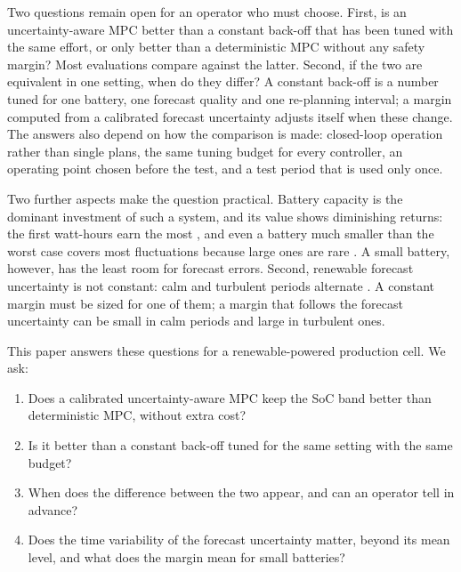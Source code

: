 \documentclass[a4paper,fleqn]{cas-dc}
\begin{document}
Two questions remain open for an operator who must choose. First, is an uncertainty-aware MPC better than a constant back-off that has been tuned with the same effort, or only better than a deterministic MPC without any safety margin? Most evaluations compare against the latter. Second, if the two are equivalent in one setting, when do they differ? A constant back-off is a number tuned for one battery, one forecast quality and one re-planning interval; a margin computed from a calibrated forecast uncertainty adjusts itself when these change. The answers also depend on how the comparison is made: closed-loop operation rather than single plans, the same tuning budget for every controller, an operating point chosen before the test, and a test period that is used only once.

Two further aspects make the question practical. Battery capacity is the dominant investment of such a system, and its value shows diminishing returns: the first watt-hours earn the most \cite{weniger2014sizing,quoilin2016quantifying,mulleriyawage2020optimally}, and even a battery much smaller than the worst case covers most fluctuations because large ones are rare \cite{makibar2017relation}. A small battery, however, has the least room for forecast errors. Second, renewable forecast uncertainty is not constant: calm and turbulent periods alternate \cite{widen2015variability,stein2012variability}. A constant margin must be sized for one of them; a margin that follows the forecast uncertainty can be small in calm periods and large in turbulent ones.

This paper answers these questions for a renewable-powered production cell. We ask:
\begin{enumerate}
\item[RQ1] Does a calibrated uncertainty-aware MPC keep the SoC band better than deterministic MPC, without extra cost?
\item[RQ2] Is it better than a constant back-off tuned for the same setting with the same budget?
\item[RQ3] When does the difference between the two appear, and can an operator tell in advance?
\item[RQ4] Does the time variability of the forecast uncertainty matter, beyond its mean level, and what does the margin mean for small batteries?
\end{enumerate}
\end{document}
